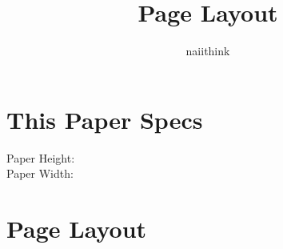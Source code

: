 \documentclass{article}
\title{Page Layout}
\author{naiithink}
\date{}
\begin{document}
\maketitle
\tableofcontents
\newpage
\section{This Paper Specs}
Paper Height: \the\paperheight\\
Paper Width: \the\paperwidth
\newpage

\section{Page Layout}
\layout
\newpage
\end{document}
